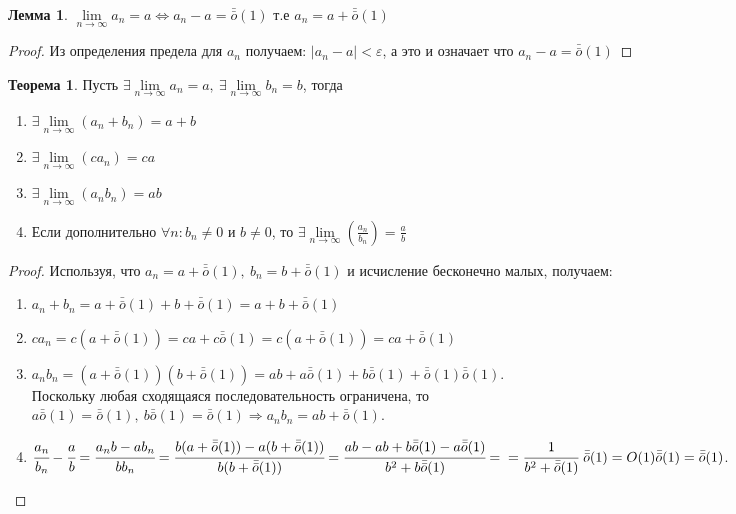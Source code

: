 \documentclass[a4paper, 12pt]{article}
\renewcommand{\epsilon}{\varepsilon}
\newcommand{\om}{\bar{\bar{o}}}
\theoremstyle{definition}
\newtheorem*{theorem}{Теорема}
\newtheorem*{lemma}{Лемма}
\begin{document}
        \begin{lemma}
            $\lim\limits_{n\to \infty}a_n=a \Leftrightarrow a_n-a=\om(1)$ т.е $a_n=a+\bar{\bar{o}}{(1)}$
        \end{lemma} 
        \begin{proof}
            Из определения предела для $a_n$ получаем: $|a_n-a|<\epsilon$, а это и означает что $a_n-a=\bar{\bar{o}}{(1)}$
        \end{proof} 
        \begin{theorem}
            Пусть $\exists \lim\limits_{n\to\infty} a_n=a,\ \exists \lim\limits_{n\to\infty} b_n=b$, тогда
            \begin{enumerate}
                \item $\exists \lim\limits_{n\to\infty} (a_n+b_n) = a+b$
                \item $\exists \lim\limits_{n\to\infty} (ca_n) = ca$
                \item $\exists \lim\limits_{n\to\infty} (a_n b_n) = ab$
                \item Если дополнительно $\forall n: b_n\ne 0$ и $b\ne 0$, то $\exists \lim\limits_{n\to\infty} (\frac{a_n}{b_n})=\frac{a}{b}$
            \end{enumerate}
        \end{theorem} 
        \begin{proof}
            Используя, что $a_n=a+\bar{\bar{o}}{(1)},\ b_n=b+\bar{\bar{o}}{(1)}$ и исчисление бесконечно малых, получаем:
            \begin{enumerate}
                \item $a_n+b_n=a+\om(1)+b+\om(1)=a+b+\om(1)$
                \item $ca_n=c(a+\om(1))=ca+c\om(1)=c(a+\om(1))=ca+\om(1)$
                \item $a_n b_n=(a+\om(1))(b+\om(1))=ab+a \bar{\bar{o}}{(1)}+b \bar{\bar{o}}{(1)}+\bar{\bar{o}}{(1)}\bar{\bar{o}}{(1)}$.
                \\Поскольку любая сходящаяся последовательность ограничена, то\\
                $a \bar{\bar{o}}{(1)}=\bar{\bar{o}}{(1)},\ b \bar{\bar{o}}{(1)}=\bar{\bar{o}}{(1)} \Rightarrow a_n b_n=ab + \bar{\bar{o}}{(1)}$.
                \item $\cfrac{a_n}{b_n}-\cfrac{a}{b}=\cfrac{a_n b-ab_n}{bb_n}=\cfrac{b(a+\bar{\bar{o}}{(1)})-a(b+\bar{\bar{o}}{(1)})}{b(b+\bar{\bar{o}}{(1)})}=\cfrac{ab-ab+b \bar{\bar{o}}{(1)}-a \bar{\bar{o}}{(1)}}{b^2+b \bar{\bar{o}}{(1)}}=\\=\cfrac{1}{b^2+\bar{\bar{o}}{(1)}}\ \bar{\bar{o}}{(1)}=O(1) \bar{\bar{o}}{(1)}=\bar{\bar{o}}{(1)}$.
            \end{enumerate}
        \end{proof}
\end{document}
